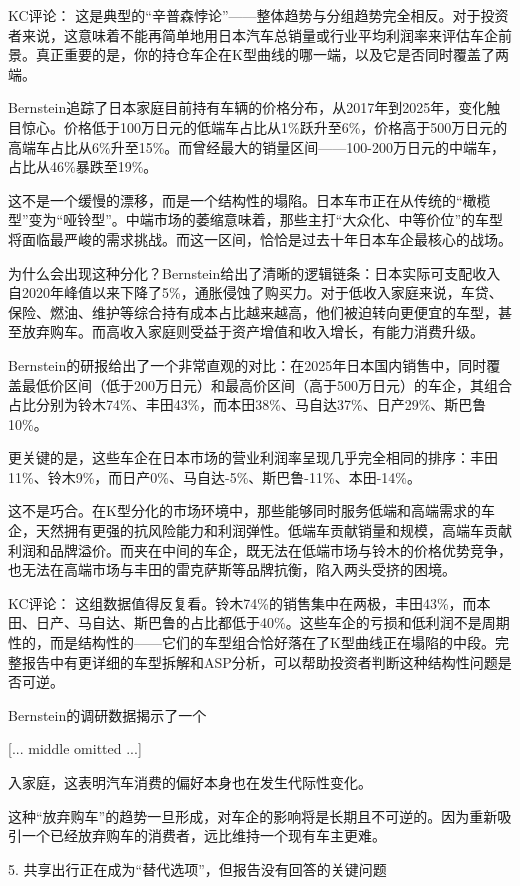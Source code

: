 \documentclass[11pt]{ctexart}
\begin{document}
KC评论： 这是典型的“辛普森悖论”——整体趋势与分组趋势完全相反。对于投资者来说，这意味着不能再简单地用日本汽车总销量或行业平均利润率来评估车企前景。真正重要的是，你的持仓车企在K型曲线的哪一端，以及它是否同时覆盖了两端。

Bernstein追踪了日本家庭目前持有车辆的价格分布，从2017年到2025年，变化触目惊心。价格低于100万日元的低端车占比从1\%跃升至6\%，价格高于500万日元的高端车占比从6\%升至15\%。而曾经最大的销量区间——100-200万日元的中端车，占比从46\%暴跌至19\%。

这不是一个缓慢的漂移，而是一个结构性的塌陷。日本车市正在从传统的“橄榄型”变为“哑铃型”。中端市场的萎缩意味着，那些主打“大众化、中等价位”的车型将面临最严峻的需求挑战。而这一区间，恰恰是过去十年日本车企最核心的战场。

为什么会出现这种分化？Bernstein给出了清晰的逻辑链条：日本实际可支配收入自2020年峰值以来下降了5\%，通胀侵蚀了购买力。对于低收入家庭来说，车贷、保险、燃油、维护等综合持有成本占比越来越高，他们被迫转向更便宜的车型，甚至放弃购车。而高收入家庭则受益于资产增值和收入增长，有能力消费升级。

Bernstein的研报给出了一个非常直观的对比：在2025年日本国内销售中，同时覆盖最低价区间（低于200万日元）和最高价区间（高于500万日元）的车企，其组合占比分别为铃木74\%、丰田43\%，而本田38\%、马自达37\%、日产29\%、斯巴鲁10\%。

更关键的是，这些车企在日本市场的营业利润率呈现几乎完全相同的排序：丰田11\%、铃木9\%，而日产0\%、马自达-5\%、斯巴鲁-11\%、本田-14\%。

这不是巧合。在K型分化的市场环境中，那些能够同时服务低端和高端需求的车企，天然拥有更强的抗风险能力和利润弹性。低端车贡献销量和规模，高端车贡献利润和品牌溢价。而夹在中间的车企，既无法在低端市场与铃木的价格优势竞争，也无法在高端市场与丰田的雷克萨斯等品牌抗衡，陷入两头受挤的困境。

KC评论： 这组数据值得反复看。铃木74\%的销售集中在两极，丰田43\%，而本田、日产、马自达、斯巴鲁的占比都低于40\%。这些车企的亏损和低利润不是周期性的，而是结构性的——它们的车型组合恰好落在了K型曲线正在塌陷的中段。完整报告中有更详细的车型拆解和ASP分析，可以帮助投资者判断这种结构性问题是否可逆。

Bernstein的调研数据揭示了一个

[... middle omitted ...]

入家庭，这表明汽车消费的偏好本身也在发生代际性变化。

这种“放弃购车”的趋势一旦形成，对车企的影响将是长期且不可逆的。因为重新吸引一个已经放弃购车的消费者，远比维持一个现有车主更难。

5. 共享出行正在成为“替代选项”，但报告没有回答的关键问题
\end{document}
